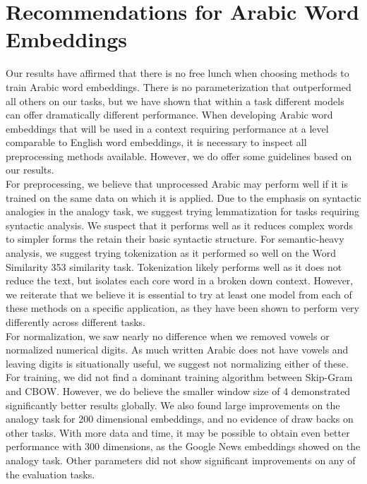 \chapter{Recommendations for Arabic Word Embeddings}
\label{sec:recommendations}

Our results have affirmed that there is no free lunch when choosing methods to train Arabic word embeddings. There is no parameterization that outperformed all others on our tasks, but we have shown that within a task different models can offer dramatically different performance. When developing Arabic word embeddings that will be used in a context requiring performance at a level comparable to English word embeddings, it is necessary to inspect all preprocessing methods available. However, we do offer some guidelines based on our results.
\\
For preprocessing, we believe that unprocessed Arabic may perform well if it is trained on the same data on which it is applied. Due to the emphasis on syntactic analogies in the analogy task, we suggest trying lemmatization for tasks requiring syntactic analysis. We suspect that it performs well as it reduces complex words to simpler forms the retain their basic syntactic structure. For semantic-heavy analysis, we suggest trying tokenization as it performed so well on the Word Similarity 353 similarity task. Tokenization likely performs well as it does not reduce the text, but isolates each core word in a broken down context. However, we reiterate that we believe it is essential to try at least one model from each of these methods on a specific application, as they have been shown to perform very differently across different tasks.
\\
For normalization, we saw nearly no difference when we removed vowels or normalized numerical digits. As much written Arabic does not have vowels and leaving digits is situationally useful, we suggest not normalizing either of these. For training, we did not find a dominant training algorithm between Skip-Gram and CBOW. However, we do believe the smaller window size of 4 demonstrated significantly better results globally. We also found large improvements on the analogy task for 200 dimensional embeddings, and no evidence of draw backs on other tasks. With more data and time, it may be possible to obtain even better performance with 300 dimensions, as the Google News embeddings showed on the analogy task. Other parameters did not show significant improvements on any of the evaluation tasks.